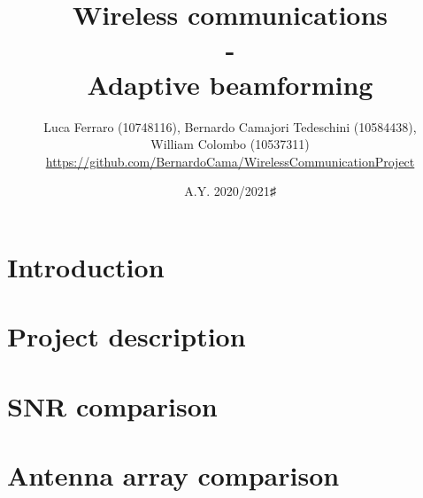 \documentclass{article} %
\title{\textbf{\huge{Wireless communications \\ 
                             - \\ 
                    Adaptive beamforming}}}
\author{Luca Ferraro (10748116), Bernardo Camajori Tedeschini (10584438), \\
            William Colombo (10537311)\\ 
\textcolor{url_blue}{\url{https://github.com/BernardoCama/WirelessCommunicationProject}}}
\date{A.Y. 2020/2021♯}
\begin{document}

\begin{titlingpage}
    \maketitle
\end{titlingpage}

\newpage{}

\tableofcontents
\listoffigures
\lstlistoflistings
\newpage{}

\clearpage
\section{Introduction}
\label{sec:introduction}


\clearpage
\section{Project description}
\label{sec:project}


\clearpage
\section{SNR comparison}
\label{sec:snr_comparison}


\clearpage
\section{Antenna array comparison}
\label{sec:antenna_array_comparison}


\clearpage
\end{document}

